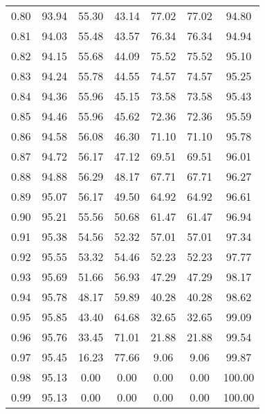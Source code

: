 \begin{tabular}{|c|c|c|c|c|c|c|}
      0.80 &     93.94 &     55.30 &      43.14 &   77.02 &      77.02 &         94.80 \\
      0.81 &     94.03 &     55.48 &      43.57 &   76.34 &      76.34 &         94.94 \\
      0.82 &     94.15 &     55.68 &      44.09 &   75.52 &      75.52 &         95.10 \\
      0.83 &     94.24 &     55.78 &      44.55 &   74.57 &      74.57 &         95.25 \\
      0.84 &     94.36 &     55.96 &      45.15 &   73.58 &      73.58 &         95.43 \\
      0.85 &     94.46 &     55.96 &      45.62 &   72.36 &      72.36 &         95.59 \\
      0.86 &     94.58 &     56.08 &      46.30 &   71.10 &      71.10 &         95.78 \\
      0.87 &     94.72 &     56.17 &      47.12 &   69.51 &      69.51 &         96.01 \\
      0.88 &     94.88 &     56.29 &      48.17 &   67.71 &      67.71 &         96.27 \\
      0.89 &     95.07 &     56.17 &      49.50 &   64.92 &      64.92 &         96.61 \\
      0.90 &     95.21 &     55.56 &      50.68 &   61.47 &      61.47 &         96.94 \\
      0.91 &     95.38 &     54.56 &      52.32 &   57.01 &      57.01 &         97.34 \\
      0.92 &     95.55 &     53.32 &      54.46 &   52.23 &      52.23 &         97.77 \\
      0.93 &     95.69 &     51.66 &      56.93 &   47.29 &      47.29 &         98.17 \\
      0.94 &     95.78 &     48.17 &      59.89 &   40.28 &      40.28 &         98.62 \\
      0.95 &     95.85 &     43.40 &      64.68 &   32.65 &      32.65 &         99.09 \\
      0.96 &     95.76 &     33.45 &      71.01 &   21.88 &      21.88 &         99.54 \\
      0.97 &     95.45 &     16.23 &      77.66 &    9.06 &       9.06 &         99.87 \\
      0.98 &     95.13 &      0.00 &       0.00 &    0.00 &       0.00 &        100.00 \\
      0.99 &     95.13 &      0.00 &       0.00 &    0.00 &       0.00 &        100.00 \\
\bottomrule
\end{tabular}
